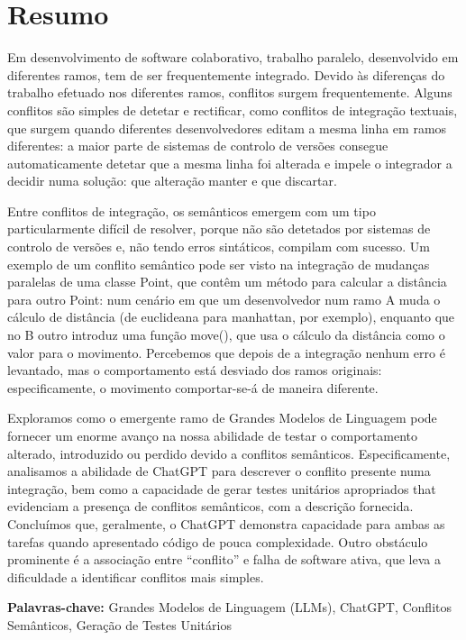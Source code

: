 \chapter*{Resumo}

Em desenvolvimento de software colaborativo, trabalho paralelo, desenvolvido em diferentes ramos, tem de ser frequentemente integrado. Devido às diferenças do trabalho efetuado nos diferentes ramos, conflitos surgem frequentemente. Alguns conflitos são simples de detetar e rectificar, como conflitos de integração textuais, que surgem quando diferentes desenvolvedores editam a mesma linha em ramos diferentes: a maior parte de sistemas de controlo de versões consegue automaticamente detetar que a mesma linha foi alterada e impele o integrador a decidir numa solução: que alteração manter e que discartar.

Entre conflitos de integração, os semânticos emergem com um tipo particularmente difícil de resolver, porque não são detetados por sistemas de controlo de versões e, não tendo erros sintáticos, compilam com sucesso. 
Um exemplo de um conflito semântico pode ser visto na integração de mudanças paralelas de uma classe Point, que contêm um método para calcular a distância para outro Point: num cenário em que um desenvolvedor num ramo A muda o cálculo de distância (de euclideana para manhattan, por exemplo), enquanto que no B outro introduz uma função move(), que usa o cálculo da distância como o valor para o movimento. Percebemos que depois de a integração nenhum erro é levantado, mas o comportamento está desviado dos ramos originais: especificamente, o movimento comportar-se-á de maneira diferente.

Exploramos como o emergente ramo de Grandes Modelos de Linguagem pode fornecer um enorme avanço na nossa abilidade de testar o comportamento alterado, introduzido ou perdido devido a conflitos semânticos.
Especificamente, analisamos a abilidade de ChatGPT para descrever o conflito presente numa integração, bem como a capacidade de gerar testes unitários apropriados that evidenciam a presença de conflitos semânticos, com a descrição fornecida.
Concluímos que, geralmente, o ChatGPT demonstra capacidade para ambas as tarefas quando apresentado código de pouca complexidade. Outro obstáculo prominente é a associação entre ``conflito'' e falha de software ativa, que leva a 
dificuldade a identificar conflitos mais simples.

\bigskip\noindent
\textbf{Palavras-chave:} Grandes Modelos de Linguagem (LLMs), ChatGPT, Conflitos Semânticos, Geração de Testes Unitários

